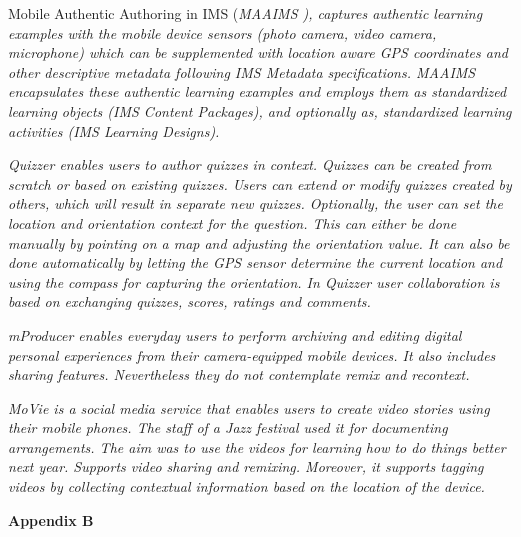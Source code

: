 \begin{small}
Mobile Authentic Authoring in IMS (\em MAAIMS \em), \cite{Jesse2012} captures authentic learning examples with the mobile device sensors (photo camera, video camera, microphone) which can be supplemented with location aware GPS coordinates and other descriptive metadata following IMS Metadata specifications. \em MAAIMS \em encapsulates these authentic learning examples and employs them as standardized learning objects (IMS Content Packages), and optionally as, standardized learning activities (IMS Learning Designs).

\em Quizzer \em \cite{Giemza2012} enables users to author quizzes in context. Quizzes can be created from scratch or based on existing quizzes. Users can extend or modify quizzes created by others, which will result in separate new quizzes. Optionally, the user can set the location and orientation context for the question. This can either be done manually by pointing on a map and adjusting the orientation value. It can also be done automatically by letting the GPS sensor determine the current location and using the compass for capturing the orientation. In \em Quizzer \em user collaboration is based on exchanging quizzes, scores, ratings and comments.

\em mProducer \em \cite{Wu2006} enables everyday users to perform archiving and editing digital personal experiences from their camera-equipped mobile devices. It also includes sharing features. Nevertheless they do not contemplate remix and recontext.

\em MoVie \em \cite{Multisilta2010} is a social media service that enables users to create video stories using their mobile phones. The staff of a Jazz festival used it for documenting arrangements. The aim was to use the videos for learning how to do things better next year. Supports video sharing and remixing. Moreover, it supports tagging videos by collecting contextual information based on the location of the device.

\end{small}



\clearpage{\pagestyle{empty}\cleardoublepage}

\begin{Large}
\textbf{Appendix B} 
\end{Large}
\vspace{3em}

